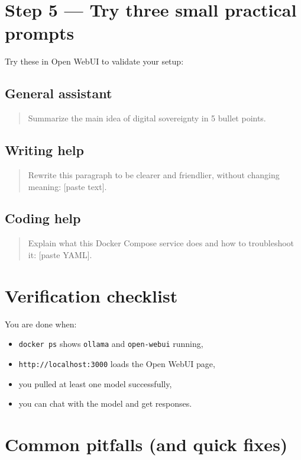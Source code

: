 
\section{Step 5 --- Try three small practical prompts}
Try these in Open WebUI to validate your setup:

\subsection*{General assistant}
\begin{quote}
Summarize the main idea of digital sovereignty in 5 bullet points.
\end{quote}

\subsection*{Writing help}
\begin{quote}
Rewrite this paragraph to be clearer and friendlier, without changing meaning: [paste text].
\end{quote}

\subsection*{Coding help}
\begin{quote}
Explain what this Docker Compose service does and how to troubleshoot it: [paste YAML].
\end{quote}

\section{Verification checklist}
You are done when:
\begin{itemize}[leftmargin=*]
  \item \texttt{docker ps} shows \texttt{ollama} and \texttt{open-webui} running,
  \item \texttt{http://localhost:3000} loads the Open WebUI page,
  \item you pulled at least one model successfully,
  \item you can chat with the model and get responses.
\end{itemize}

\section{Common pitfalls (and quick fixes)}
